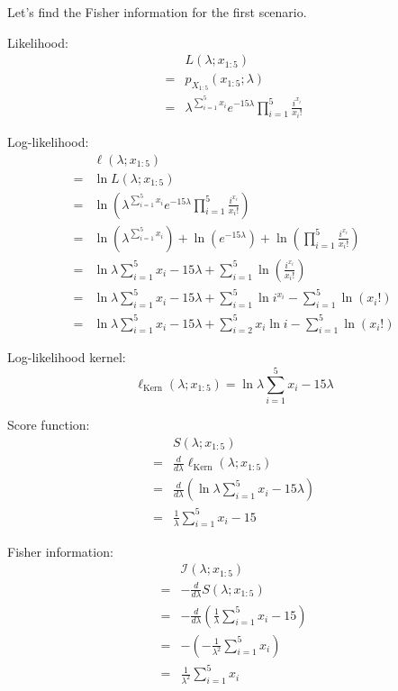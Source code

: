 \documentclass{article}
\begin{document}
\begin{ssolution}

Let's find the Fisher information for the first scenario.

Likelihood:
\begin{align*}
	& L(\lambda;x_{1:5}) \\
	=& p_{X_{1:5}}(x_{1:5};\lambda) \\
	=& \lambda^{\sum_{i=1}^5 x_i} e^{-15\lambda}\prod_{i=1}^5\frac{i^{x_i}}{x_i !}
\end{align*}

Log-likelihood:
\begin{align*}
	& \ell(\lambda;x_{1:5}) \\
	=& \ln L(\lambda;x_{1:5}) \\
	=& \ln \left( \lambda^{\sum_{i=1}^5 x_i} e^{-15\lambda}\prod_{i=1}^5\frac{i^{x_i}}{x_i !} \right) \\
	=& \ln \left( \lambda^{\sum_{i=1}^5 x_i} \right) + \ln \left( e^{-15\lambda} \right) + \ln \left( \prod_{i=1}^5\frac{i^{x_i}}{x_i !} \right) \\
	=& \ln \lambda \sum_{i=1}^5 x_i - 15\lambda + \sum_{i=1}^5\ln \left( \frac{i^{x_i}}{x_i !} \right) \\
	=& \ln \lambda \sum_{i=1}^5 x_i - 15\lambda + \sum_{i=1}^5\ln i^{x_i} - \sum_{i=1}^5\ln (x_i!) \\
	=& \ln \lambda \sum_{i=1}^5 x_i - 15\lambda + \sum_{i=2}^5 x_i\ln i - \sum_{i=1}^5\ln (x_i!)
\end{align*}

Log-likelihood kernel:
\[\ell_{\text{Kern}}(\lambda;x_{1:5}) = \ln \lambda \sum_{i=1}^5 x_i - 15\lambda\]

Score function:
\begin{align*}
	& S(\lambda;x_{1:5}) \\
	=& \frac{d}{d\lambda} \ell_{\text{Kern}}(\lambda;x_{1:5}) \\
	=& \frac{d}{d\lambda} \left(\ln \lambda \sum_{i=1}^5 x_i - 15\lambda \right) \\
	=& \frac{1}{\lambda} \sum_{i=1}^5 x_i - 15
\end{align*}

Fisher information:
\begin{align*}
	& \mathcal{I}(\lambda;x_{1:5}) \\
	=& -\frac{d}{d\lambda}S(\lambda;x_{1:5}) \\
	=& -\frac{d}{d\lambda} \left(\frac{1}{\lambda} \sum_{i=1}^5 x_i - 15\right) \\
	=& -\left(-\frac{1}{\lambda^2} \sum_{i=1}^5 x_i \right) \\
	=& \frac{1}{\lambda^2} \sum_{i=1}^5 x_i
\end{align*}


\end{ssolution}
\end{document}
